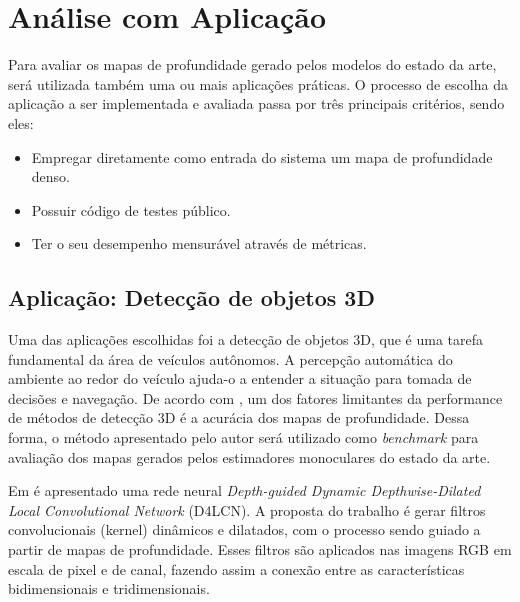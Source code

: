 \section{Análise com Aplicação}

Para avaliar os mapas de profundidade gerado pelos modelos do estado da arte, será utilizada também uma ou mais aplicações práticas. O processo de escolha da aplicação a ser implementada e avaliada passa por três principais critérios, sendo eles: 

\begin{itemize}
    \item Empregar diretamente como entrada do sistema um mapa de profundidade denso.
    \item Possuir código de testes público.
    \item Ter o seu desempenho mensurável através de métricas. 
\end{itemize}

\subsection{Aplicação: Detecção de objetos 3D}

Uma das aplicações escolhidas foi a detecção de objetos 3D, que é uma tarefa fundamental da área de veículos autônomos. A percepção automática do ambiente ao redor do veículo ajuda-o a entender a situação para tomada de decisões e navegação. De acordo com , um dos fatores limitantes da performance de métodos de detecção 3D é a acurácia dos mapas de profundidade. Dessa forma, o método apresentado pelo autor será utilizado como \textit{benchmark} para avaliação dos mapas gerados pelos estimadores monoculares do estado da arte.

Em  é apresentado uma rede neural \textit{Depth-guided Dynamic Depthwise-Dilated Local Convolutional Network} (D4LCN). A proposta do trabalho é gerar filtros convolucionais (kernel) dinâmicos e dilatados, com o processo sendo guiado a partir de mapas de profundidade. Esses filtros são aplicados nas imagens RGB em escala de pixel e de canal, fazendo assim a conexão entre as características bidimensionais e tridimensionais.


